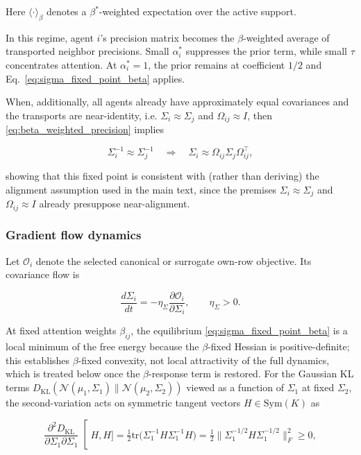 \documentclass[twoside,11pt]{article}
\begin{document}
Here $\langle\cdot\rangle_\beta$ denotes a $\beta^*$-weighted expectation over the active support.

In this regime, agent $i$'s precision matrix becomes the $\beta$-weighted average of transported neighbor precisions. Small $\alpha_i^*$ suppresses the prior term, while small $\tau$ concentrates attention. At $\alpha_i^*=1$, the prior remains at coefficient $1/2$ and Eq.~\eqref{eq:sigma_fixed_point_beta} applies.

When, additionally, all agents already have approximately equal covariances and the transports are near-identity, i.e. $\Sigma_i \approx \Sigma_j$ and $\Omega_{ij} \approx I$, then \eqref{eq:beta_weighted_precision} implies

\begin{equation}
\Sigma_i^{-1} \approx \Sigma_j^{-1}
\quad\Longrightarrow\quad
\Sigma_i \approx \Omega_{ij}\Sigma_j\Omega_{ij}^\top,
\end{equation}

showing that this fixed point is consistent with (rather than deriving) the alignment assumption used in the main text, since the premises $\Sigma_i \approx \Sigma_j$ and $\Omega_{ij} \approx I$ already presuppose near-alignment.

\subsubsection{Gradient flow dynamics}

Let $\mathcal{O}_i$ denote the selected canonical or surrogate own-row objective. Its covariance flow is

\begin{equation}
\frac{d\Sigma_i}{dt}
=-\eta_\Sigma
\frac{\partial \mathcal{O}_i}{\partial \Sigma_i},
\qquad\eta_\Sigma > 0.
\end{equation}

At fixed attention weights $\beta_{ij}$, the equilibrium \eqref{eq:sigma_fixed_point_beta} is a local minimum of the free energy because the $\beta$-fixed Hessian is positive-definite; this establishes $\beta$-fixed convexity, not local attractivity of the full dynamics, which is treated below once the $\beta$-response term is restored. For the Gaussian KL terms $D_{\mathrm{KL}}(\mathcal{N}(\mu_1,\Sigma_1) \| \mathcal{N}(\mu_2,\Sigma_2))$ viewed as a function of $\Sigma_1$ at fixed $\Sigma_2$, the second-variation acts on symmetric tangent vectors $H \in \mathrm{Sym}(K)$ as

\begin{equation}
\left.\frac{\partial^2 D_{\mathrm{KL}}}{\partial \Sigma_1 \partial \Sigma_1}\right[H, H]
=
\tfrac{1}{2} \mathrm{tr}\big(\Sigma_1^{-1} H \Sigma_1^{-1} H\big)
=
\tfrac{1}{2} \big\|\Sigma_1^{-1/2} H \Sigma_1^{-1/2}\big\|_F^2 \geq 0,
\end{equation}
\end{document}
